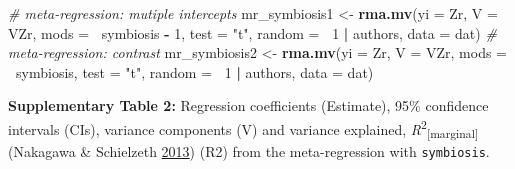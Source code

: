 \documentclass[
]{article}
\newenvironment{Shaded}{\begin{snugshade}}{\end{snugshade}}
\newcommand{\CommentTok}[1]{\textcolor[rgb]{0.56,0.35,0.01}{\textit{#1}}}
\newcommand{\DataTypeTok}[1]{\textcolor[rgb]{0.13,0.29,0.53}{#1}}
\newcommand{\DecValTok}[1]{\textcolor[rgb]{0.00,0.00,0.81}{#1}}
\newcommand{\KeywordTok}[1]{\textcolor[rgb]{0.13,0.29,0.53}{\textbf{#1}}}
\newcommand{\NormalTok}[1]{#1}
\newcommand{\OperatorTok}[1]{\textcolor[rgb]{0.81,0.36,0.00}{\textbf{#1}}}
\newcommand{\StringTok}[1]{\textcolor[rgb]{0.31,0.60,0.02}{#1}}
\begin{document}
\begin{Shaded}
\begin{Highlighting}[]
\CommentTok{# meta-regression: mutiple intercepts}
\NormalTok{mr_symbiosis1 <-}\StringTok{ }\KeywordTok{rma.mv}\NormalTok{(}\DataTypeTok{yi =}\NormalTok{ Zr, }\DataTypeTok{V =}\NormalTok{ VZr, }\DataTypeTok{mods =} \OperatorTok{~}\NormalTok{symbiosis }\OperatorTok{-}\StringTok{ }\DecValTok{1}\NormalTok{, }\DataTypeTok{test =} \StringTok{"t"}\NormalTok{, }\DataTypeTok{random =} \OperatorTok{~}\DecValTok{1} \OperatorTok{|}\StringTok{ }
\StringTok{    }\NormalTok{authors, }\DataTypeTok{data =}\NormalTok{ dat)}
\CommentTok{# meta-regression: contrast}
\NormalTok{mr_symbiosis2 <-}\StringTok{ }\KeywordTok{rma.mv}\NormalTok{(}\DataTypeTok{yi =}\NormalTok{ Zr, }\DataTypeTok{V =}\NormalTok{ VZr, }\DataTypeTok{mods =} \OperatorTok{~}\NormalTok{symbiosis, }\DataTypeTok{test =} \StringTok{"t"}\NormalTok{, }\DataTypeTok{random =} \OperatorTok{~}\DecValTok{1} \OperatorTok{|}\StringTok{ }
\StringTok{    }\NormalTok{authors, }\DataTypeTok{data =}\NormalTok{ dat)}
\end{Highlighting}
\end{Shaded}

\textbf{Supplementary Table 2:} Regression coefficients (Estimate), 95\%
confidence intervals (CIs), variance components (V) and variance
explained, \emph{R}\textsuperscript{2}\textsubscript{{[}marginal{]}}
(Nakagawa \& Schielzeth
\protect\hyperlink{ref-nakagawa2013general}{2013}) (R2) from the
meta-regression with \texttt{symbiosis}.
\end{document}
